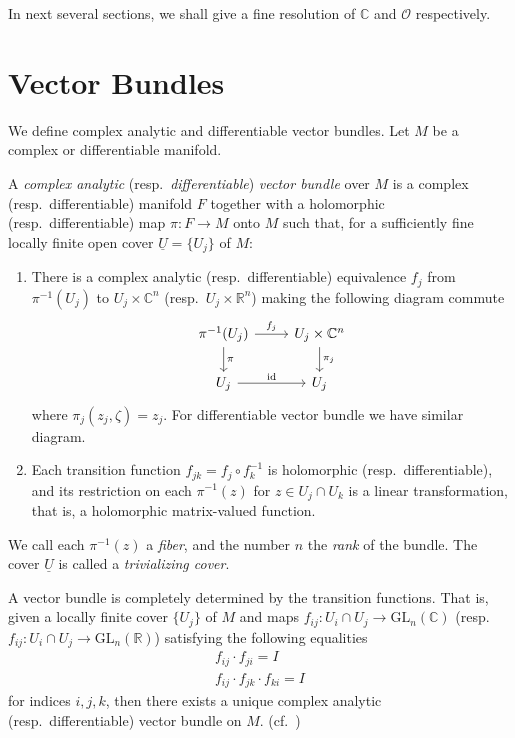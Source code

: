 In next several sections, we shall give a fine resolution of $\mathbb{C}$ and $\mathcal{O}$ respectively.

\section{Vector Bundles}

We define complex analytic and differentiable vector bundles.
Let $M$ be a complex or differentiable manifold.

\begin{defn}
    A \emph{complex analytic} (resp.\ \emph{differentiable}) \emph{vector bundle} over $M$ is a complex (resp.\ differentiable) manifold $F$ together with a holomorphic (resp.\ differentiable) map $\pi:F\to M$ onto $M$ such that, for a sufficiently fine locally finite open cover $\underline{U}=\{U_j\}$ of $M$:
    \begin{enumerate}[(1)]
        \item There is a complex analytic (resp.\ differentiable) equivalence $f_j$ from $\pi^{-1}(U_j)$ to $U_j\times\mathbb{C}^n$ (resp.\ $U_j\times\mathbb{R}^n$) making the following diagram commute
        \[\begin{tikzcd}
            \pi^{-1}(U_j) \ar[d,"\pi"]\ar[r,"f_j"] & U_j\times\mathbb{C}^n \ar[d,"\pi_j"]\\
            U_j \ar[r,"\mathrm{id}"] & U_j
        \end{tikzcd}\]
        where $\pi_j(z_j,\zeta)=z_j$.
        For differentiable vector bundle we have similar diagram.
        \item Each transition function $f_{jk}=f_j\circ f_k^{-1}$ is holomorphic (resp.\ differentiable), and its restriction on each $\pi^{-1}(z)$ for $z\in U_j\cap U_k$ is a linear transformation, that is, a holomorphic matrix-valued function.
    \end{enumerate}
    We call each $\pi^{-1}(z)$ a \emph{fiber}, and the number $n$ the \emph{rank} of the bundle.
    The cover $\underline{U}$ is called a \emph{trivializing cover}.
\end{defn}

\begin{rem}
    A vector bundle is completely determined by the transition functions.
    That is, given a locally finite cover $\{U_j\}$ of $M$ and maps $f_{ij}:U_i\cap U_j\to\mathrm{GL}_n(\mathbb{C})$ (resp.\ $f_{ij}:U_i\cap U_j\to\mathrm{GL}_n(\mathbb{R})$) satisfying the following equalities
    \begin{equation}
        \begin{gathered}
            f_{ij}\cdot f_{ji}=I \\
            f_{ij}\cdot f_{jk}\cdot f_{ki}=I
        \end{gathered}\label{transition functions}
    \end{equation}
    for indices $i,j,k$, then there exists a unique complex analytic (resp.\ differentiable) vector bundle on $M$.
    (cf.\ \cite[p.\ 66]{G-H})
\end{rem}


